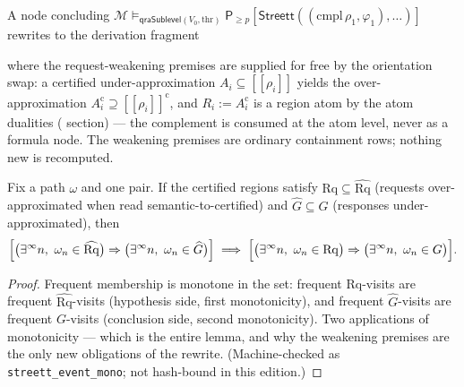

\begin{brecipe}\label{rec:scr-instance}
A node concluding
$\mathcal{M} \vDash_{\mathsf{qraSublevel}(V_0,\mathrm{thr})}
\mathsf{P}_{\ge p}[\mathsf{Streett}((\mathrm{cmpl}\,\rho_1, \varphi_1),
\ldots)]$ rewrites to the derivation fragment
\begin{mathpar}
\end{mathpar}
where the request-weakening premises are supplied for free by the
orientation swap: a certified under-approximation $A_i \subseteq
[\![\rho_i]\!]$ yields the over-approximation $A_i^{\mathrm{c}} \supseteq
[\![\rho_i]\!]^{\mathrm{c}}$, and $R_i := A_i^{\mathrm{c}}$ is a region
atom by the atom dualities ( section) --- the
complement is consumed at the atom level, never as a formula node. The
weakening premises are ordinary containment rows; nothing new is
recomputed.
\end{brecipe}

\begin{bprop}\label{prop:scr-mono}
Fix a path $\omega$ and one pair. If the certified regions satisfy
$\mathrm{Rq} \subseteq \widehat{\mathrm{Rq}}$ (requests
over-approximated when read semantic-to-certified) and
$\widehat{G} \subseteq G$ (responses under-approximated), then
\[
\Bigl[\bigl(\exists^\infty n,\ \omega_n \in \widehat{\mathrm{Rq}}\bigr)
\Rightarrow \bigl(\exists^\infty n,\ \omega_n \in \widehat{G}\bigr)\Bigr]
\;\Longrightarrow\;
\Bigl[\bigl(\exists^\infty n,\ \omega_n \in \mathrm{Rq}\bigr)
\Rightarrow \bigl(\exists^\infty n,\ \omega_n \in G\bigr)\Bigr] .
\]
\end{bprop}
\begin{proof}
Frequent membership is monotone in the set: frequent
$\mathrm{Rq}$-visits are frequent $\widehat{\mathrm{Rq}}$-visits
(hypothesis side, first monotonicity), and frequent $\widehat{G}$-visits
are frequent $G$-visits (conclusion side, second monotonicity). Two
applications of monotonicity --- which is the entire lemma, and why the
weakening premises are the only new obligations of the rewrite.
(Machine-checked as \texttt{streett\_event\_mono}; not hash-bound in this edition.)
\end{proof}

